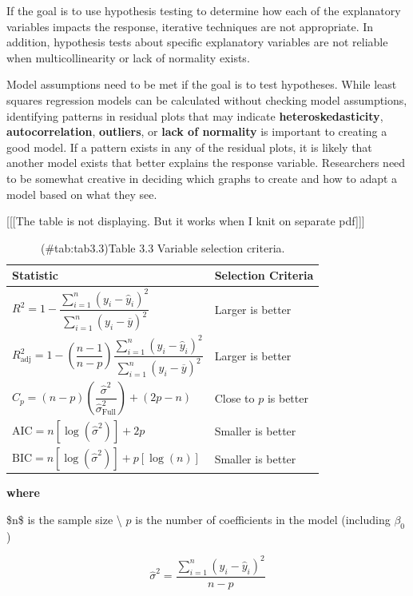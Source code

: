 \documentclass[
]{report}
\begin{document}
If the goal is to use hypothesis testing to determine how each of the explanatory variables impacts the response, iterative techniques are not appropriate. In addition, hypothesis tests about specific explanatory variables are not reliable when multicollinearity or lack of normality exists.

Model assumptions need to be met if the goal is to test hypotheses. While least squares regression models can be calculated without checking model assumptions, identifying patterns in residual plots that may indicate \textbf{heteroskedasticity}, \textbf{autocorrelation}, \textbf{outliers}, or \textbf{lack of normality} is important to creating a good model. If a pattern exists in any of the residual plots, it is likely that another model exists that better explains the response variable. Researchers need to be somewhat creative in deciding which graphs to create and how to adapt a model based on what they see.

{[}{[}{[}The table is not displaying. But it works when I knit on separate pdf{]}{]}{]}

\begin{table}[!h]
\centering
\caption{(\#tab:tab3.3)Table 3.3 Variable selection criteria.}
\centering
\begin{tabular}[t]{ll}
\toprule
Statistic & Selection Criteria\\
\midrule
$R^2 = 1 - \dfrac{\sum_{i=1}^n (y_i - \hat{y}_i)^2}{\sum_{i=1}^n (y_i - \overline{y})^2}$ & Larger is better\\
$R^2_{\text{adj}} = 1 - \left( \dfrac{n-1}{n-p} \right) \dfrac{\sum_{i=1}^n (y_i - \hat{y}_i)^2}{\sum_{i=1}^n (y_i - \overline{y})^2}$ & Larger is better\\
$C_p = (n-p) \left( \dfrac{\hat{\sigma}^2}{\hat{\sigma}_{\text{Full}}^2} \right) + (2p-n)$ & Close to $p$ is better\\
$\text{AIC} = n[\log(\hat{\sigma}^2)] + 2p$ & Smaller is better\\
$\text{BIC} = n[\log(\hat{\sigma}^2)] + p[\log(n)]$ & Smaller is better\\
\bottomrule
\end{tabular}
\end{table}
\vspace{0.5em}

\textbf{where}

\$n\$ is the sample size \textbackslash{}
\quad \(p\) is the number of coefficients in the model (including \(\beta_0\))

\[
  \hat{\sigma}^2 = \frac{\sum_{i=1}^n (y_i - \hat{y}_i)^2}{n - p}
\]
\end{document}

